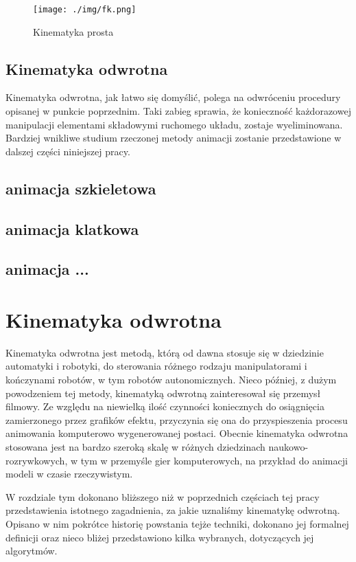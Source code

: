 \documentclass[11pt]{mwrep}
\begin{document}
  \begin{figure}
  \centering
    \texttt{[image: ./img/fk.png]}
  \caption{Kinematyka prosta}
  \label{img:fk}
  \end{figure}

  \section{Kinematyka odwrotna}

  Kinematyka odwrotna, jak łatwo się domyślić, polega na odwróceniu procedury opisanej w punkcie poprzednim. Taki zabieg sprawia, że konieczność każdorazowej manipulacji elementami składowymi ruchomego układu, zostaje wyeliminowana. Bardziej wnikliwe studium rzeczonej metody animacji zostanie przedstawione w dalszej części niniejszej pracy.

  \section{animacja szkieletowa}
  \section{animacja klatkowa}
  \section{animacja ...}
  
\chapter{Kinematyka odwrotna}

Kinematyka odwrotna jest metodą, którą od dawna stosuje się w dziedzinie automatyki i robotyki, do sterowania różnego rodzaju manipulatorami i kończynami robotów, w tym robotów autonomicznych. Nieco później, z dużym powodzeniem tej metody, kinematyką odwrotną zainteresował się przemysł filmowy. Ze względu na niewielką ilość czynności koniecznych do osiągnięcia zamierzonego przez grafików efektu, przyczynia się ona do przyspieszenia procesu animowania komputerowo wygenerowanej postaci. Obecnie kinematyka odwrotna stosowana jest na bardzo szeroką skalę w różnych dziedzinach naukowo-rozrywkowych, w tym w przemyśle gier komputerowych, na przykład do animacji modeli w czasie rzeczywistym.

W rozdziale tym dokonano bliższego niż w poprzednich częściach tej pracy przedstawienia istotnego zagadnienia, za jakie uznaliśmy kinematykę odwrotną. Opisano w nim pokrótce historię powstania tejże techniki, dokonano jej formalnej definicji oraz nieco bliżej przedstawiono kilka wybranych, dotyczących jej algorytmów.
\end{document}

